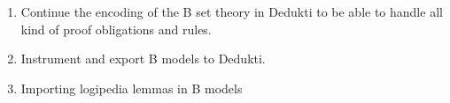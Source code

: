 





\begin{enumerate}

  \item Continue the encoding of the B set theory in Dedukti to be
  able to handle all kind of proof obligations and rules.


  \item Instrument and export B models to Dedukti.

  \item Importing logipedia lemmas in B models

\end{enumerate}
